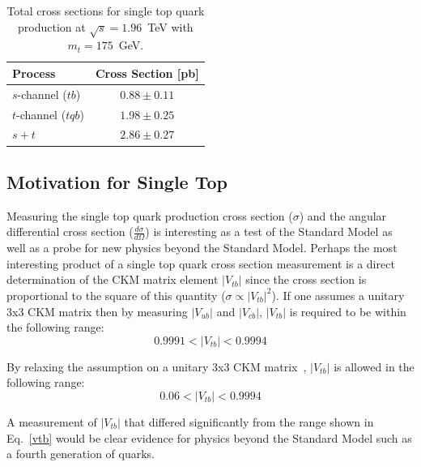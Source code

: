 \vspace{0.2in}
\begin{table}[!h!tbp]
\begin{center}
\caption{Total cross sections for single top quark
production at $\sqrt{s} = 1.96$~TeV with $m_t=175$~GeV.}
\label{singletopcross}
\begin{minipage}{2.2 in}
\begin{tabular}{lc}
Process & Cross Section [pb] \\
\hline
$s$-channel ($tb$)	&	$0.88 \pm 0.11$		\\
$t$-channel ($tqb$)	&	$1.98 \pm 0.25$		\\
$s+t$			&	$2.86 \pm 0.27$		\\
\end{tabular}
\vspace{-0.1 in}
\end{minipage}
\end{center}
\end{table}



\subsection{Motivation for Single Top}
\label{motivation}

Measuring the single top quark production cross section ($\sigma$) and the angular differential cross section ($\frac{d\sigma}{d\Omega}$) is interesting as a test of the Standard Model as well as a probe for new physics beyond the Standard Model. Perhaps the most interesting product of a single top quark cross section measurement is a direct determination of the CKM matrix element $|V_{tb}|$ since the cross section is proportional to the square of this quantity ($\sigma\propto|V_{tb}|^{2}$).
If one assumes a unitary 3x3 CKM matrix then by measuring $|V_{ub}|$ and $|V_{cb}|$, $|V_{tb}|$ is required to be within the following range:
\begin{equation}
0.9991 < |V_{tb}| < 0.9994
\label{vtb}
\end{equation}

By relaxing the assumption on a unitary 3x3 CKM matrix~\cite{PhysRevD.63.014018}, $|V_{tb}|$ is allowed in the following range:
\begin{equation}
0.06 < |V_{tb}| < 0.9994
\end{equation}

A measurement of $|V_{tb}|$ that differed significantly from the range shown in Eq.~\ref{vtb} would be clear evidence for physics beyond the Standard Model such as a fourth generation of quarks.

